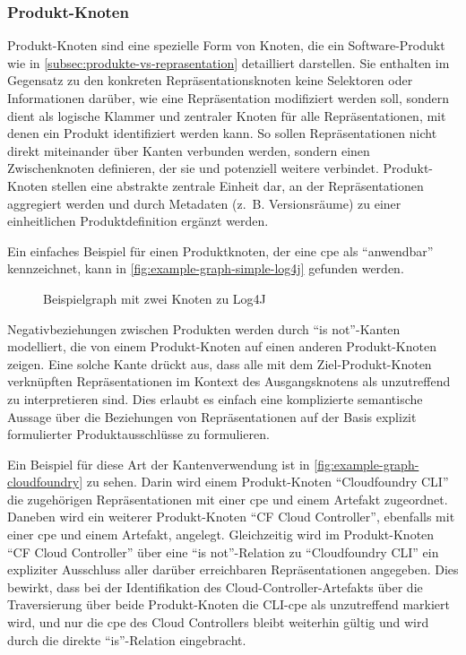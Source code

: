 \subsubsection{Produkt-Knoten}\label{subsubsec:model-product-node}
Produkt-Knoten sind eine spezielle Form von Knoten, die ein Software-Produkt wie in \autoref{subsec:produkte-vs-reprasentation} detailliert darstellen.
Sie enthalten im Gegensatz zu den konkreten Repräsentationsknoten keine Selektoren oder Informationen darüber, wie eine Repräsentation modifiziert werden soll, sondern dient als logische Klammer und zentraler Knoten für alle Repräsentationen, mit denen ein Produkt identifiziert werden kann.
So sollen Repräsentationen nicht direkt miteinander über Kanten verbunden werden, sondern einen Zwischenknoten definieren, der sie und potenziell weitere verbindet.
Produkt-Knoten stellen eine abstrakte zentrale Einheit dar, an der Repräsentationen aggregiert werden und durch Metadaten (z.\ B. Versionsräume) zu einer einheitlichen Produktdefinition ergänzt werden.

Ein einfaches Beispiel für einen Produktknoten, der eine \acrshort{cpe} als \enquote{anwendbar} kennzeichnet, kann in \autoref{fig:example-graph-simple-log4j} gefunden werden.

\begin{figure}[htbp]
    \centering
    \makebox[\textwidth]{}
    \caption{Beispielgraph mit zwei Knoten zu Log4J}
    \label{fig:example-graph-simple-log4j}
\end{figure}

Negativbeziehungen zwischen Produkten werden durch \enquote{is not}-Kanten modelliert, die von einem Produkt-Knoten auf einen anderen Produkt-Knoten zeigen.
Eine solche Kante drückt aus, dass alle mit dem Ziel-Produkt-Knoten verknüpften Repräsentationen im Kontext des Ausgangsknotens als unzutreffend zu interpretieren sind.
Dies erlaubt es einfach eine komplizierte semantische Aussage über die Beziehungen von Repräsentationen auf der Basis explizit formulierter Produktausschlüsse zu formulieren.

Ein Beispiel für diese Art der Kantenverwendung ist in \autoref{fig:example-graph-cloudfoundry} zu sehen.
Darin wird einem Produkt-Knoten \enquote{Cloudfoundry CLI} die zugehörigen Repräsentationen mit einer \acrshort{cpe} und einem Artefakt zugeordnet.
Daneben wird ein weiterer Produkt-Knoten \enquote{CF Cloud Controller}, ebenfalls mit einer \acrshort{cpe} und einem Artefakt, angelegt.
Gleichzeitig wird im Produkt-Knoten \enquote{CF Cloud Controller} über eine \enquote{is not}-Relation zu \enquote{Cloudfoundry CLI} ein expliziter Ausschluss aller darüber erreichbaren Repräsentationen angegeben.
Dies bewirkt, dass bei der Identifikation des Cloud-Controller-Artefakts über die Traversierung über beide Produkt-Knoten die CLI-\acrshort{cpe} als unzutreffend markiert wird, und nur die \acrshort{cpe} des Cloud Controllers bleibt weiterhin gültig und wird durch die direkte \enquote{is}-Relation eingebracht.

